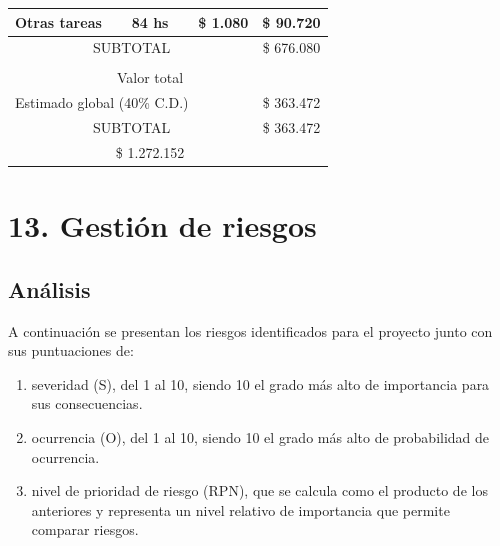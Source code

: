 \documentclass[
11pt, %
codirector, %
]{charter}
\begin{document}
\begin{table}[htpb]
\begin{tabularx}{\linewidth}{@{}|X|c|r|r|@{}}
 Otras tareas &
  \multicolumn{1}{c|}{84 hs} &
  \multicolumn{1}{c|}{\$ 1.080} &
  \multicolumn{1}{c|}{\$ 90.720} \\ \hline
  
\multicolumn{3}{|c|}{SUBTOTAL} &
  \multicolumn{1}{c|}{\$ 676.080} \\ \hline  
  
\rowcolor[HTML]{C0C0C0} 
\multicolumn{4}{|c|}{\cellcolor[HTML]{C0C0C0}COSTOS INDIRECTOS} \\ \hline

\rowcolor[HTML]{C0C0C0} 
\multicolumn{3}{|l|}{Descripción} &
  \multicolumn{1}{c|}{\cellcolor[HTML]{C0C0C0}Valor total} \\ \hline
\multicolumn{3}{|l|}{Estimado global (40\% C.D.)} & \multicolumn{1}{c|}{\$ 363.472 } \\ \hline


\multicolumn{3}{|c|}{SUBTOTAL} &  
  \multicolumn{1}{c|}{\$ 363.472 } \\ \hline
\rowcolor[HTML]{C0C0C0}
\multicolumn{3}{|c|}{TOTAL} &
  \multicolumn{1}{c|}{\$ 1.272.152 } \\ \hline
\end{tabularx}%
\end{table}


\section{13. Gestión de riesgos}
\label{sec:riesgos}
\subsection*{Análisis}

A continuación se presentan los riesgos identificados para el proyecto junto con sus puntuaciones de:
\begin{enumerate}
\renewcommand{\theenumi}{\alph{enumi}} %
	\item severidad (S), del 1 al 10, siendo 10 el grado más alto de importancia para sus consecuencias.
	\item ocurrencia (O), del 1 al 10, siendo 10 el grado más alto de probabilidad de ocurrencia.
	\item nivel de prioridad de riesgo (RPN), que se calcula como el producto de los anteriores y representa un nivel relativo de importancia que permite comparar riesgos. 
\end{enumerate}  
\end{document}
